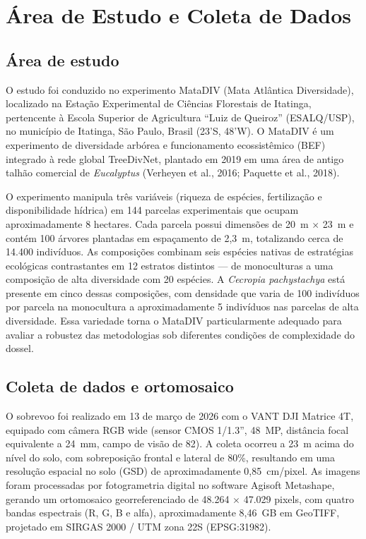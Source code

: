 \documentclass[12pt, a4paper]{article}
\begin{document}
\section{Área de Estudo e Coleta de Dados}
\label{sec:area}

\subsection{Área de estudo}

O estudo foi conduzido no experimento MataDIV (Mata Atlântica Diversidade),
localizado na Estação Experimental de Ciências Florestais de Itatinga, pertencente
à Escola Superior de Agricultura ``Luiz de Queiroz'' (ESALQ/USP), no município de
Itatinga, São Paulo, Brasil (23'S, 48'W). O MataDIV é um
experimento de diversidade arbórea e funcionamento ecossistêmico (BEF) integrado à
rede global TreeDivNet, plantado em 2019 em uma área de antigo talhão comercial de
\textit{Eucalyptus} (Verheyen et al., 2016; Paquette et al., 2018).

O experimento manipula três variáveis (riqueza de espécies, fertilização e
disponibilidade hídrica) em 144 parcelas experimentais que ocupam aproximadamente
8 hectares. Cada parcela possui dimensões de 20~m $\times$ 23~m e contém 100
árvores plantadas em espaçamento de 2,3~m, totalizando cerca de 14.400 indivíduos.
As composições combinam seis espécies nativas de estratégias ecológicas
contrastantes em 12 estratos distintos — de monoculturas a uma composição de alta
diversidade com 20 espécies. A \textit{Cecropia pachystachya} está presente em
cinco dessas composições, com densidade que varia de 100 indivíduos por parcela na
monocultura a aproximadamente 5 indivíduos nas parcelas de alta diversidade. Essa
variedade torna o MataDIV particularmente adequado para avaliar a robustez das
metodologias sob diferentes condições de complexidade do dossel.

\subsection{Coleta de dados e ortomosaico}
\label{sec:ortomosaico}

O sobrevoo foi realizado em 13 de março de 2026 com o VANT DJI Matrice 4T,
equipado com câmera RGB wide (sensor CMOS 1/1.3'', 48~MP, distância focal
equivalente a 24~mm, campo de visão de 82\textdegree). A coleta ocorreu a 23~m
acima do nível do solo, com sobreposição frontal e lateral de 80\%, resultando em
uma resolução espacial no solo (GSD) de aproximadamente 0,85~cm/pixel. As imagens
foram processadas por fotogrametria digital no software Agisoft Metashape,
gerando um ortomosaico georreferenciado de 48.264 $\times$ 47.029 pixels, com
quatro bandas espectrais (R, G, B e alfa), aproximadamente 8,46~GB em GeoTIFF,
projetado em SIRGAS 2000 / UTM zona 22S (EPSG:31982).
\end{document}
